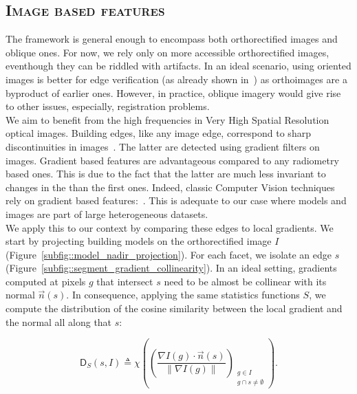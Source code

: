     \subsection{\textsc{Image based features}}
        \label{subsec::learned_evaluation::baseline::image}
        The framework is general enough to encompass both orthorectified images and oblique ones.
        For now, we rely only on more accessible orthorectified images, eventhough they can be riddled with artifacts.
        In an ideal scenario, using oriented images is better for edge verification (as already shown in~\parencite{michelin2013quality}) as orthoimages are a byproduct of earlier ones.
        However, in practice, oblique imagery would give rise to other issues, especially, registration problems.\\

        We aim to benefit from the high frequencies in Very High Spatial Resolution optical images.
        Building edges, like any image edge, correspond to sharp discontinuities in images~\parencite{ortner2007building}.
        The latter are detected using gradient filters on images.
        Gradient based features are advantageous compared to any radiometry based ones.
        This is due to the fact that the latter are much less invariant to changes in the than the first ones.
        Indeed, classic Computer Vision techniques rely on gradient based features:~\textcite{lowe2004distinctive,dalal2005histograms}.
        This is adequate to our case where models and images are part of large heterogeneous datasets.\\
        

        We apply this to our context by comparing these edges to local gradients.
        We start by projecting building models on the orthorectified image $I$ (Figure~\ref{subfig::model_nadir_projection}).
        For each facet, we isolate an edge $s$ (Figure~\ref{subfig::segment_gradient_collinearity}).
        In an ideal setting, gradients computed at pixels $g$ that intersect $s$ need to be almost be collinear with its normal $\vec{n}(s)$.
        In consequence, applying the same statistics functions $S$, we compute the distribution of the cosine similarity between the local gradient and the normal all along that $s$:
        
        \begin{equation}
            \label{eq::corr_seg}
            \mathsf{D}_S(s, I) \triangleq \chi \left( \left(\frac{\nabla I\left(g\right) \cdot \vec{n}(s)}{\left\rVert \nabla I\left(g\right)\right\rVert}\right)_{\substack{g \in I \\ g \cap s \neq \emptyset}} \right).
        \end{equation}

